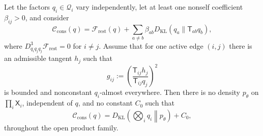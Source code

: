 \begin{theorem}
\label{thm:state_level_elbo_nogo}
Let the factors $q_i\in\mathcal{Q}_i$ vary independently, let at least one nonself coefficient $\beta_{ij}>0$, and consider
\begin{equation}
\mathcal{C}_{\mathrm{cons}}(q)
=\mathcal{F}_{\mathrm{rest}}(q)
+\sum_{a\ne b}\beta_{ab}D_{\mathrm{KL}}(q_a\|\mathsf{T}_{ab}q_b),
\label{eq:population_consensus_nogo_functional}
\end{equation}
where $D^3_{q_iq_jq_j}\mathcal{F}_{\mathrm{rest}}=0$ for $i\ne j$. Assume that for one active edge $(i,j)$ there is an admissible tangent $h_j$ such that
\begin{equation}
g_{ij}:=\left(\frac{\mathsf{T}_{ij}h_j}{\mathsf{T}_{ij}q_j}\right)^2
\label{eq:nogo_nondegenerate_tangent}
\end{equation}
is bounded and nonconstant $q_i$-almost everywhere. Then there is no density $p_\theta$ on $\prod_i\mathsf{X}_i$, independent of $q$, and no constant $C_0$ such that
\begin{equation}
\mathcal{C}_{\mathrm{cons}}(q)
=D_{\mathrm{KL}}\left(\bigotimes_iq_i\middle\|p_\theta\right)+C_0,
\label{eq:state_level_elbo_representation_impossible}
\end{equation}
throughout the open product family.
\end{theorem}

